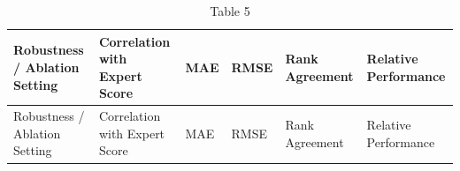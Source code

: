 \documentclass[
  12pt,
]{article}
\begin{document}
\begin{longtable}[]{@{}
  >{\raggedright\arraybackslash}p{}
  >{\raggedleft\arraybackslash}p{}
  >{\raggedleft\arraybackslash}p{}
  >{\raggedleft\arraybackslash}p{}
  >{\raggedleft\arraybackslash}p{}
  >{\raggedleft\arraybackslash}p{}@{}}
\caption{Table 5}\label{tbl-regression}\tabularnewline
\toprule\noalign{}
\begin{minipage}[b]{\linewidth}\raggedright
Robustness / Ablation Setting
\end{minipage} & \begin{minipage}[b]{\linewidth}\raggedleft
Correlation with Expert Score
\end{minipage} & \begin{minipage}[b]{\linewidth}\raggedleft
MAE
\end{minipage} & \begin{minipage}[b]{\linewidth}\raggedleft
RMSE
\end{minipage} & \begin{minipage}[b]{\linewidth}\raggedleft
Rank Agreement
\end{minipage} & \begin{minipage}[b]{\linewidth}\raggedleft
Relative Performance
\end{minipage} \\
\midrule\noalign{}
\endfirsthead
\toprule\noalign{}
\begin{minipage}[b]{\linewidth}\raggedright
Robustness / Ablation Setting
\end{minipage} & \begin{minipage}[b]{\linewidth}\raggedleft
Correlation with Expert Score
\end{minipage} & \begin{minipage}[b]{\linewidth}\raggedleft
MAE
\end{minipage} & \begin{minipage}[b]{\linewidth}\raggedleft
RMSE
\end{minipage} & \begin{minipage}[b]{\linewidth}\raggedleft
Rank Agreement
\end{minipage} & \begin{minipage}[b]{\linewidth}\raggedleft
Relative Performance
\end{minipage} \\

\end{longtable}
\end{document}
